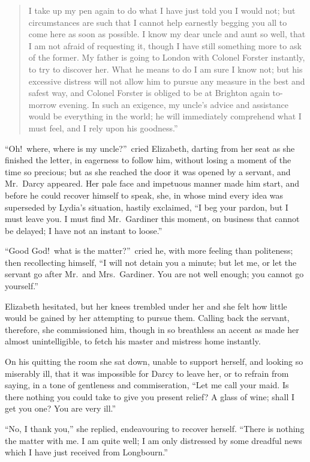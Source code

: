 \documentclass[12pt,english,oneside]{book}
\begin{document}
\begin{quotation}{}
I take up my pen again to do what I have just told you I would not;
but circumstances are such that I cannot help earnestly begging you
all to come here as soon as possible. I know my dear uncle and aunt
so well, that I am not afraid of requesting it, though I have still
something more to ask of the former. My father is going to London
with Colonel Forster instantly, to try to discover her. What he means
to do I am sure I know not; but his excessive distress will not allow
him to pursue any measure in the best and safest way, and Colonel
Forster is obliged to be at Brighton again to-morrow evening. In such
an exigence, my uncle's advice and assistance would be everything
in the world; he will immediately comprehend what I must feel, and
I rely upon his goodness.''\end{quotation}

{}``Oh!\ where, where is my uncle?''\ cried Elizabeth, darting
from her seat as she finished the letter, in eagerness to follow him,
without losing a moment of the time so precious; but as she reached
the door it was opened by a servant, and Mr.\ Darcy appeared. Her
pale face and impetuous manner made him start, and before he could
recover himself to speak, she, in whose mind every idea was superseded
by Lydia's situation, hastily exclaimed, {}``I beg your pardon, but
I must leave you. I must find Mr.\ Gardiner this moment, on business
that cannot be delayed; I have not an instant to loose.''

{}``Good God!\ what is the matter?''\ cried he, with more feeling
than politeness; then recollecting himself, {}``I will not detain
you a minute; but let me, or let the servant go after Mr.\ and Mrs.\ 
Gardiner. You are not well enough; you cannot go yourself.''

Elizabeth hesitated, but her knees trembled under her and she felt
how little would be gained by her attempting to pursue them. Calling
back the servant, therefore, she commissioned him, though in so breathless
an accent as made her almost unintelligible, to fetch his master and
mistress home instantly.

On his quitting the room she sat down, unable to support herself,
and looking so miserably ill, that it was impossible for Darcy to
leave her, or to refrain from saying, in a tone of gentleness and
commiseration, {}``Let me call your maid. Is there nothing you could
take to give you present relief? A glass of wine; shall I get you
one? You are very ill.''

{}``No, I thank you,'' she replied, endeavouring to recover herself.
{}``There is nothing the matter with me. I am quite well; I am only
distressed by some dreadful news which I have just received from Longbourn.''
\end{document}
